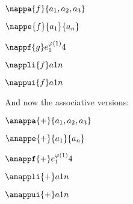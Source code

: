 \documentclass[minimal]{omdoc}
\begin{document}
$\nappa{f}{a_1,a_2,a_3}$

$\nappe{f}{a_1}{a_n}$

\newcommand\eph[1]{e_{#1}^{\varphi(#1)}}
$ \nappf{g}\eph14$

$\nappli{f}a1n$

$\nappui{f}a1n$

And now the associative versions:

$\anappa{+}{a_1,a_2,a_3}$

$\anappe{+}{a_1}{a_n}$

$\anappf{+}\eph14$

$\anappli{+}a1n$

$\anappui{+}a1n$
\end{document}
